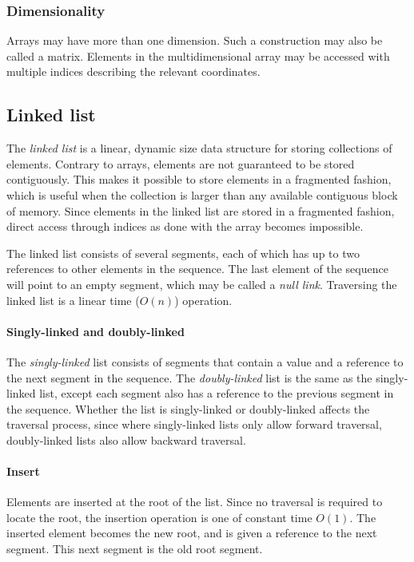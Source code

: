 \documentclass{article}
\begin{document}
\subsubsection{Dimensionality}
Arrays may have more than one dimension. Such a construction may also be called a matrix.
Elements in the multidimensional array may be accessed with multiple indices describing the relevant coordinates.


\newpage


\subsection{Linked list}
The {\em linked list} is a linear, dynamic size data structure for storing collections of elements.
Contrary to arrays, elements are not guaranteed to be stored contiguously.
This makes it possible to store elements in a fragmented fashion,
which is useful when the collection is larger than any available contiguous block of memory.
Since elements in the linked list are stored in a fragmented fashion, direct access through indices
as done with the array becomes impossible.

The linked list consists of several segments, each of which has up to two references to other
elements in the sequence. The last element of the sequence will point to an empty segment,
which may be called a {\em null link}. Traversing the linked list is a linear time (\(O(n)\)) operation.

\paragraph{Singly-linked and doubly-linked}
The {\em singly-linked} list consists of segments that contain a value and a reference to the next
segment in the sequence. The {\em doubly-linked} list is the same as the singly-linked list,
except each segment also has a reference to the previous segment in the sequence.
Whether the list is singly-linked or doubly-linked affects the traversal process,
since where singly-linked lists only allow forward traversal, doubly-linked lists also allow backward traversal.

\paragraph{Insert}
Elements are inserted at the root of the list. Since no traversal is required to locate the root,
the insertion operation is one of constant time \(O(1)\). The inserted element becomes the new root,
and is given a reference to the next segment. This next segment is the old root segment.
\end{document}
